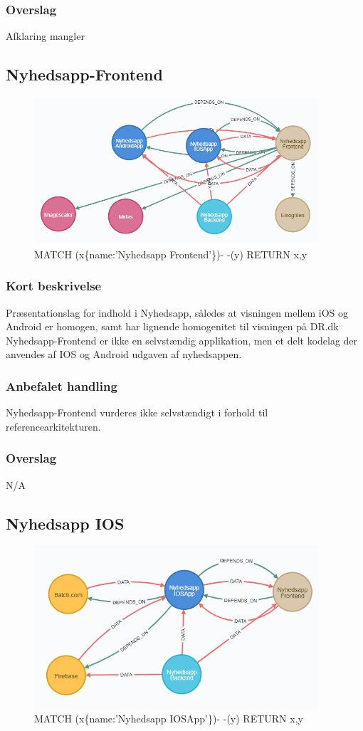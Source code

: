 \documentclass{article}
\begin{document}
\subsubsection{Overslag}
Afklaring mangler

\subsection{Nyhedsapp-Frontend}
\begin{figure}[h]
\includegraphics[width=300pt]{Nyhedsapp Frontend.PNG}
\caption{MATCH (x\{name:'Nyhedsapp Frontend'\})- -(y) RETURN x,y}
\end{figure}
\subsubsection{Kort beskrivelse}
Præsentationslag for indhold i Nyhedsapp, således at visningen mellem iOS og Android er homogen, samt har lignende homogenitet til visningen på DR.dk
Nyhedsapp-Frontend er ikke en selvstændig applikation, men et delt kodelag der anvendes af IOS og Android udgaven af nyhedsappen. 
\subsubsection{Anbefalet handling}
Nyhedsapp-Frontend vurderes ikke selvstændigt i forhold til referencearkitekturen.
\subsubsection{Overslag}
N/A

\subsection{Nyhedsapp IOS}
\begin{figure}[h]
\includegraphics[width=300pt]{Nyhedsapp IOS.PNG}
\caption{MATCH (x\{name:'Nyhedsapp IOSApp'\})- -(y) RETURN x,y}
\end{figure}
\end{document}
